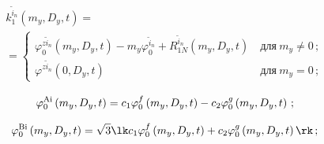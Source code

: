      \begin{multline}

      k_1^{\tilde i_n}  \left(m_y, D_y,t\right) = {}\\

      {}=

      \begin{cases}

      \varphi_0^{z\tilde i_n} \left(m_y, D_y,t\right)- 

      m_y  \varphi_0^{\tilde i_n} +R_{1N}^{\tilde i_n} \left(m_y, D_y,t\right)&\ \mbox{для}\

m_y \ne 0\,;

\\

         \varphi^{z\tilde i_n} \left(0, D_y,t\right) &\ \mbox{для}\ m_y =0\,;

         \end{cases}

       \label{e3.10-sin}

       \end{multline}

 \begin{equation}

 \varphi_0^{\Ai} \left(m_y, D_y,t\right) = c_1 \varphi_0^f \left(m_y, D_y,t\right) - 

 c_2 \varphi_0^g \left(m_y, D_y,t\right)\,;

 \label{e3.11-sin}

 \end{equation}

 \begin{equation}

 \varphi_0^{\Bi} \left(m_y, D_y,t\right) = 

 \sqrt{3} \lk c_1 \varphi_0^f \left(m_y, D_y,t\right) + c_2 \varphi_0^g 

 \left(m_y, D_y,t\right)\rk\,;

 \label{e3.12-sin}

 \end{equation}

 

 \vspace*{-12pt}

 

 \noindent

